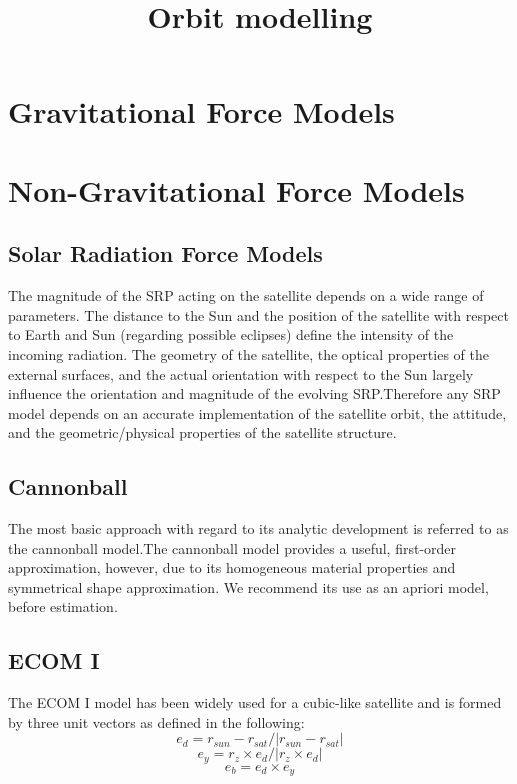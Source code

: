 \title{Orbit modelling}


\usepackage{natbib}
\usepackage{graphicx}
\usepackage{amsmath}


\maketitle


\section{Gravitational Force Models}

\section{Non-Gravitational Force Models}

\subsection{Solar Radiation Force Models}
The magnitude of the SRP acting on the satellite depends on a wide range of parameters. 
The distance to the Sun and the position of the satellite with respect to Earth and Sun (regarding possible eclipses) define the intensity of the incoming radiation.
The geometry of the satellite, the optical properties of the external surfaces, and the actual orientation with respect to the Sun largely influence the orientation and magnitude of the evolving SRP.Therefore any SRP model depends on an accurate implementation of the satellite orbit, the attitude, and the geometric/physical properties of the satellite structure.
 
\subsection{Cannonball}
\label{sec:cannonball_srp}
The most basic approach with regard to its analytic development is referred to as the cannonball
model.The cannonball model provides a useful, first-order approximation, however, due to its homogeneous material properties and symmetrical shape approximation. We recommend its use as an apriori model, before estimation.

\subsection{ECOM I}
The ECOM I model has been widely used for a cubic-like satellite and is formed by three unit vectors as defined in the following: 
\begin{equation}
e_d = r_{sun} - r_{sat} / |r_{sun} - r_{sat}|
\end{equation}
\begin{equation}
e_y = r_z \times e_d / |r_z \times e_d|
\end{equation}
\begin{equation}
e_b = e_d \times e_y 
\end{equation}

